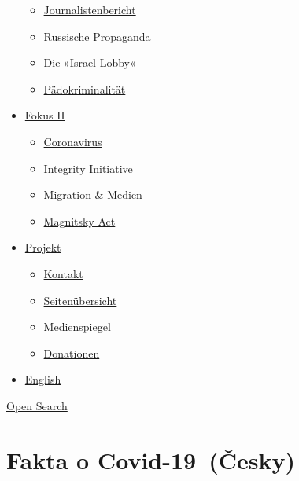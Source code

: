\begin{itemize}
  \begin{itemize}
  \tightlist
  \item
    \href{https://swprs.org/bericht-eines-journalisten/}{Journalistenbericht}
  \item
    \href{https://swprs.org/russische-propaganda/}{Russische Propaganda}
  \item
    \href{https://swprs.org/die-israel-lobby-fakten-und-mythen/}{Die
    »Israel-Lobby«}
  \item
    \href{https://swprs.org/geopolitik-und-paedokriminalitaet/}{Pädokriminalität}
  \end{itemize}
\item
  \href{https://swprs.org/migration-und-medien/}{Fokus II}

  \begin{itemize}
  \tightlist
  \item
    \href{https://swprs.org/covid-19-hinweis-ii/}{Coronavirus}
  \item
    \href{https://swprs.org/die-integrity-initiative/}{Integrity
    Initiative}
  \item
    \href{https://swprs.org/migration-und-medien/}{Migration \& Medien}
  \item
    \href{https://swprs.org/der-fall-magnitsky/}{Magnitsky Act}
  \end{itemize}
\item
  \href{https://swprs.org/kontakt/}{Projekt}

  \begin{itemize}
  \tightlist
  \item
    \href{https://swprs.org/kontakt/}{Kontakt}
  \item
    \href{https://swprs.org/uebersicht/}{Seitenübersicht}
  \item
    \href{https://swprs.org/medienspiegel/}{Medienspiegel}
  \item
    \href{https://swprs.org/donationen/}{Donationen}
  \end{itemize}
\item
  \href{https://swprs.org/contact/}{English}
\end{itemize}

\protect\hyperlink{}{Open Search}

\hypertarget{fakta-o-covid-19-ux10desky}{%
\section{Fakta o Covid-19~(Česky)}\label{fakta-o-covid-19-ux10desky}}

